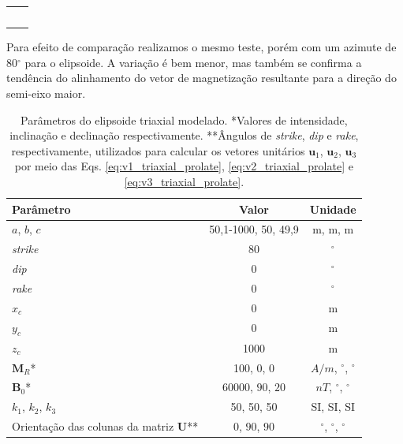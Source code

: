 \begin{table}[h!]
	\begin{center}
		\begin{tabular}{lc}
			
			& \\
			& \\
			& \\
			& \\
			& \\
			
		\end{tabular}
	\end{center}
\end{table}

Para efeito de comparação realizamos o mesmo teste, porém com um azimute de 80$^{\circ}$ para o elipsoide. A variação é bem menor, mas também se confirma a tendência do alinhamento do vetor de magnetização resultante para a direção do semi-eixo maior.

\vspace{2cm}

\begin{table}[h!]
	\begin{center}
		\begin{tabular}{|l|c|c|}
			\hline
			\textbf{Parâmetro}  & \textbf{Valor}  & \textbf{Unidade }\\
			\hline 
			$a$, $b$, $c$  & 50,1-1000, 50, 49,9 & m, m, m\\
			\hline
			\textit{strike}   & $80$ & $^{\circ}$\\
			\hline
			\textit{dip}    & $0$ & $^{\circ}$\\
			\hline
			\textit{rake}   & $0$  & $^{\circ}$\\
			\hline
			$x_c$   & 0  & m\\
			\hline          
			$y_c$   & 0  & m\\
			\hline                
			$z_c$   & 1000  & m\\
			\hline
			$\mathbf{M}_{R}$*  & 100, $0$, $0$ & $A/m$, $^{\circ}$, $^{\circ}$ \\
			\hline
			$\mathbf{B}_{0}$*   & 60000, $90$, $20$ & $nT$, $^{\circ}$, $^{\circ}$\\
			\hline
			$k_{1}$, $k_{2}$, $k_{3}$   & 50, 50, 50  & SI, SI, SI\\
			\hline
			Orientação das colunas da matriz $\mathbf{U}$**   & $0$, $90$, $90$  & $^{\circ}$,  $^{\circ}$,  $^{\circ}$\\
			\hline
		\end{tabular}
		\caption{Parâmetros do elipsoide triaxial modelado. *Valores de intensidade, inclinação e declinação respectivamente. **Ângulos de \textit{strike}, \textit{dip}  e \textit{rake}, respectivamente, utilizados para calcular os vetores unitários $\mathbf{u}_{1}$, $\mathbf{u}_{2}$, $\mathbf{u}_{3}$ por meio das Eqs. \ref{eq:v1_triaxial_prolate}, \ref{eq:v2_triaxial_prolate} e \ref{eq:v3_triaxial_prolate}.}
	\end{center}
	\label{tab:ellipsoid_shape_iso80}
\end{table}

